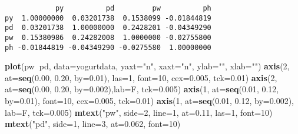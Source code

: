 \documentclass[]{book}
\newenvironment{Shaded}{\begin{snugshade}}{\end{snugshade}}
\newcommand{\DataTypeTok}[1]{\textcolor[rgb]{0.13,0.29,0.53}{#1}}
\newcommand{\DecValTok}[1]{\textcolor[rgb]{0.00,0.00,0.81}{#1}}
\newcommand{\FloatTok}[1]{\textcolor[rgb]{0.00,0.00,0.81}{#1}}
\newcommand{\KeywordTok}[1]{\textcolor[rgb]{0.13,0.29,0.53}{\textbf{#1}}}
\newcommand{\NormalTok}[1]{#1}
\newcommand{\OperatorTok}[1]{\textcolor[rgb]{0.81,0.36,0.00}{\textbf{#1}}}
\newcommand{\StringTok}[1]{\textcolor[rgb]{0.31,0.60,0.02}{#1}}
\begin{document}
\begin{verbatim}
            py          pd         pw          ph
py  1.00000000  0.03201738  0.1538099 -0.01844819
pd  0.03201738  1.00000000  0.2428201 -0.04349290
pw  0.15380986  0.24282008  1.0000000 -0.02755800
ph -0.01844819 -0.04349290 -0.0275580  1.00000000
\end{verbatim}

\begin{Shaded}
\begin{Highlighting}[]
\KeywordTok{plot}\NormalTok{(pw}\OperatorTok{~}\NormalTok{pd, }\DataTypeTok{data=}\NormalTok{yogurtdata, }\DataTypeTok{yaxt=}\StringTok{"n"}\NormalTok{, }\DataTypeTok{xaxt=}\StringTok{"n"}\NormalTok{, }\DataTypeTok{ylab=}\StringTok{""}\NormalTok{, }\DataTypeTok{xlab=}\StringTok{""}\NormalTok{)}
\KeywordTok{axis}\NormalTok{(}\DecValTok{2}\NormalTok{, }\DataTypeTok{at=}\KeywordTok{seq}\NormalTok{(}\FloatTok{0.00}\NormalTok{, }\FloatTok{0.20}\NormalTok{, }\DataTypeTok{by=}\FloatTok{0.01}\NormalTok{), }\DataTypeTok{las=}\DecValTok{1}\NormalTok{, }\DataTypeTok{font=}\DecValTok{10}\NormalTok{, }\DataTypeTok{cex=}\FloatTok{0.005}\NormalTok{, }\DataTypeTok{tck=}\FloatTok{0.01}\NormalTok{)}
\KeywordTok{axis}\NormalTok{(}\DecValTok{2}\NormalTok{, }\DataTypeTok{at=}\KeywordTok{seq}\NormalTok{(}\FloatTok{0.00}\NormalTok{, }\FloatTok{0.20}\NormalTok{, }\DataTypeTok{by=}\FloatTok{0.002}\NormalTok{),}\DataTypeTok{lab=}\NormalTok{F, }\DataTypeTok{tck=}\FloatTok{0.005}\NormalTok{)}
\KeywordTok{axis}\NormalTok{(}\DecValTok{1}\NormalTok{, }\DataTypeTok{at=}\KeywordTok{seq}\NormalTok{(}\FloatTok{0.01}\NormalTok{, }\FloatTok{0.12}\NormalTok{, }\DataTypeTok{by=}\FloatTok{0.01}\NormalTok{), }\DataTypeTok{font=}\DecValTok{10}\NormalTok{, }\DataTypeTok{cex=}\FloatTok{0.005}\NormalTok{, }\DataTypeTok{tck=}\FloatTok{0.01}\NormalTok{)}
\KeywordTok{axis}\NormalTok{(}\DecValTok{1}\NormalTok{, }\DataTypeTok{at=}\KeywordTok{seq}\NormalTok{(}\FloatTok{0.01}\NormalTok{, }\FloatTok{0.12}\NormalTok{, }\DataTypeTok{by=}\FloatTok{0.002}\NormalTok{), }\DataTypeTok{lab=}\NormalTok{F, }\DataTypeTok{tck=}\FloatTok{0.005}\NormalTok{)}
\KeywordTok{mtext}\NormalTok{(}\StringTok{"pw"}\NormalTok{, }\DataTypeTok{side=}\DecValTok{2}\NormalTok{, }\DataTypeTok{line=}\DecValTok{1}\NormalTok{, }\DataTypeTok{at=}\FloatTok{0.11}\NormalTok{, }\DataTypeTok{las=}\DecValTok{1}\NormalTok{, }\DataTypeTok{font=}\DecValTok{10}\NormalTok{)}
\KeywordTok{mtext}\NormalTok{(}\StringTok{"pd"}\NormalTok{, }\DataTypeTok{side=}\DecValTok{1}\NormalTok{, }\DataTypeTok{line=}\DecValTok{3}\NormalTok{, }\DataTypeTok{at=}\FloatTok{0.062}\NormalTok{, }\DataTypeTok{font=}\DecValTok{10}\NormalTok{)}
\end{Highlighting}
\end{Shaded}
\end{document}

